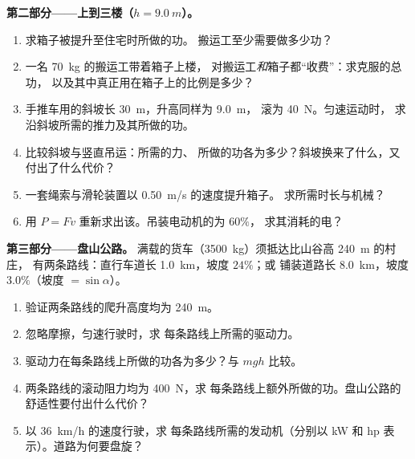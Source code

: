 \begin{problem}
\medskip
\noindent\textbf{第二部分——上到三楼（$h = \qty{9.0}{m}$）。}
\begin{enumerate}[resume]
  \item 求箱子被提升至住宅时所做的功。
        搬运工至少需要做多少功？
  \item 一名 \qty{70}{kg} 的搬运工带着箱子上楼，
        对搬运工\emph{和}箱子都“收费”：求克服的总功，
        以及其中真正用在箱子上的比例是多少？
  \item 手推车用的斜坡长 \qty{30}{m}，升高同样为 \qty{9.0}{m}，
        滚为 \qty{40}{N}。匀速运动时，
        求沿斜坡所需的推力及其所做的功。
  \item 比较斜坡与竖直吊运：所需的力、
        所做的功各为多少？斜坡换来了什么，又付出了什么代价？
  \item 一套绳索与滑轮装置以 \qty{0.50}{m/s} 的速度提升箱子。
        求所需时长与机械？
  \item 用 $P = Fv$ 重新求出该。吊装电动机的为 $60\%$，
        求其消耗的电？
\end{enumerate}

\medskip
\noindent\textbf{第三部分——盘山公路。}
满载的货车（\qty{3500}{kg}）须抵达比山谷高 \qty{240}{m} 的村庄，
有两条路线：直行车道长 \qty{1.0}{km}，坡度 $24\%$；或
铺装道路长 \qty{8.0}{km}，坡度 $3.0\%$（坡度 $= \sin\alpha$）。
\begin{enumerate}[resume]
  \item 验证两条路线的爬升高度均为 \qty{240}{m}。
  \item 忽略摩擦，匀速行驶时，求
        每条路线上所需的驱动力。
  \item 驱动力在每条路线上所做的功各为多少？与 $mgh$ 比较。
  \item 两条路线的滚动阻力均为 \qty{400}{N}，求
        每条路线上额外所做的功。盘山公路的舒适性要付出什么代价？
  \item 以 \qty{36}{km/h} 的速度行驶，求
        每条路线所需的发动机（分别以 \unit{kW} 和 \unit{hp} 表示）。道路为何要盘旋？
\end{enumerate}


\end{problem}
